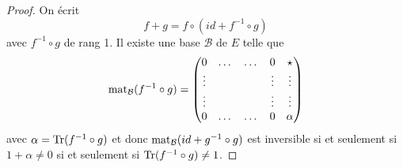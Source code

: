 \begin{proof}
    On écrit 
    \begin{equation}
        f+g=f\circ\left(id+f^{-1}\circ g\right)
    \end{equation}
    avec $f^{-1}\circ g$ de rang 1. Il existe une base $\mathcal{B}
    $ de $E$ telle que 
    \begin{equation}
        \operatorname{mat}_{\mathcal{B}}(f^{-1}\circ g)=
        \begin{pmatrix}
            0 & \dots & \dots & 0 & \star\\
            \vdots & & &\vdots &\vdots\\
            \vdots & & &\vdots & \vdots\\
            0 & \dots & \dots & 0 & \alpha
        \end{pmatrix}
    \end{equation}
    avec $\alpha=\operatorname{Tr}(f^{-1}\circ g)$ et donc $\operatorname{mat}_{\mathcal{B}}(id+g^{-1}\circ g)$ est inversible si et seulement si $1+\alpha\neq0$ si et seulement si $\operatorname{Tr}(f^{-1}\circ g)\neq 1$.
\end{proof}

